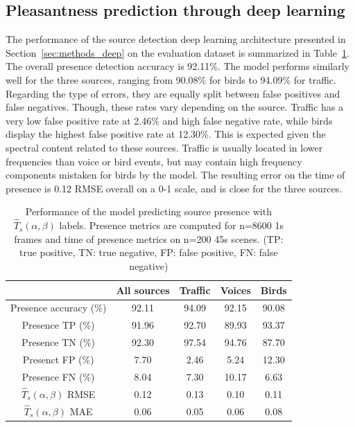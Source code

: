 \documentclass[11pt,a4paper]{article}
\begin{document}
\subsection{Pleasantness prediction through deep learning}
\label{sec:results_deep}

The performance of the source detection deep learning architecture presented in Section~\ref{sec:methods_deep} on the evaluation dataset is summarized in Table~\ref{tab:perf_cmp}. The overall presence detection accuracy is 92.11\%. The model performs similarly well for the three sources, ranging from 90.08\% for birds to 94.09\% for traffic. Regarding the type of errors, they are equally split between false positives and false negatives. Though, these rates vary depending on the source. Traffic has a very low false positive rate at 2.46\% and high false negative rate, while birds display the highest false positive rate at 12.30\%. This is expected given the spectral content related to these sources. Traffic is usually located in lower frequencies than voice or bird events, but may contain high frequency components mistaken for birds by the model. The resulting error on the time of presence is 0.12 RMSE overall on a 0-1 scale, and is close for the three sources.\\


\begin{table}[t]
\centering
\caption{Performance of the model predicting source presence with $\hat T_s(\alpha, \beta)$ labels. Presence metrics are computed for n=8600 1s frames and time of presence metrics on n=200 45s scenes. (TP: true positive, TN: true negative, FP: false positive, FN: false negative)}
\label{tab:perf_cmp}
\begin{tabular}{ c | c | c c c }
\hline
	 & All sources & Traffic & Voices & Birds \\ \hline
	Presence accuracy (\%) &  92.11 & 94.09 & 92.15 & 90.08 \\
	Presence TP (\%) & 91.96 & 92.70 & 89.93 & 93.37 \\
	Presence TN (\%) & 92.30 & 97.54 & 94.76 & 87.70 \\
	Presenct FP (\%) & 7.70 & 2.46 & 5.24 & 12.30 \\
	Presence FN (\%) & 8.04 & 7.30 & 10.17 & 6.63 \\ \hline
	$\hat T_s(\alpha, \beta)$ RMSE & 0.12 & 0.13 & 0.10 & 0.11 \\
	$\hat T_s(\alpha, \beta)$ MAE & 0.06 & 0.05 & 0.06 & 0.08 \\ \hline
\end{tabular}
\end{table}
\end{document}
